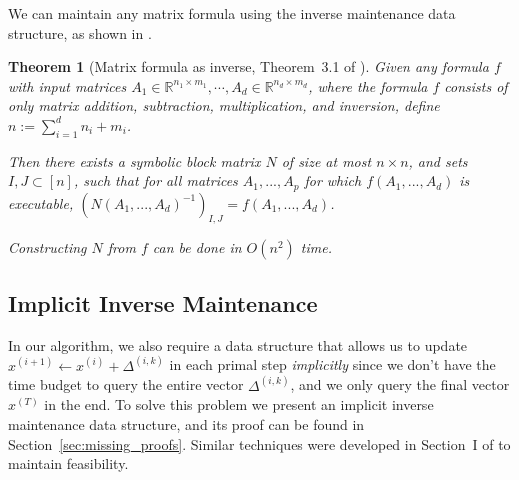 \documentclass[11pt]{article}
\newtheorem{theorem}{Theorem}[section]
\newcommand\xx{\boldsymbol{\mathit{x}}}
\renewcommand\AA{\boldsymbol{\mathit{A}}}
\newcommand\NN{\boldsymbol{\mathit{N}}}
\newcommand\R{\mathbb{R}}
\begin{document}
We can maintain any matrix formula using the inverse maintenance data structure, as shown in \cite{b21}.
\begin{theorem}[Matrix formula as inverse, Theorem~3.1 of \cite{b21}]\label{lem:matrix_formula}
Given any formula $f$ with input matrices $\AA_1 \in \R^{n_1 \times m_1}, \cdots, \AA_d \in \R^{n_d \times m_d}$, where the formula $f$ consists of only matrix addition, subtraction, multiplication, and inversion,
define $n := \sum_{i = 1}^d n_i + m_i$.

Then there exists a symbolic block matrix $\NN$ of size at most $n\times n$, and sets $I,J \subset [n]$, such that for all matrices $\AA_1,...,\AA_p$ for which $f(\AA_1,...,\AA_d)$ is executable, $(\NN(\AA_1,...,\AA_d)^{-1})_{I,J} = f(\AA_1,...,\AA_d)$.

Constructing $\NN$ from $f$ can be done in $O(n^2)$ time.
\end{theorem}


\subsection{Implicit Inverse Maintenance}
In our algorithm, we also require a data structure that allows us to update $\xx^{(i+1)} \gets \xx^{(i)} + \Delta^{(i,k)}$ in each primal step \emph{implicitly} since we don't have the time budget to query the entire vector $\Delta^{(i,k)}$, and we only query the final vector $\xx^{(T)}$ in the end. To solve this problem we present an implicit inverse maintenance data structure, and its proof can be found in Section~\ref{sec:missing_proofs}. Similar techniques were developed in Section~I of \cite{jiang2021faster} to maintain feasibility. 
\end{document}
